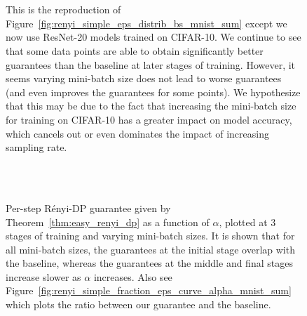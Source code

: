 \begin{figure}[t]
\centering
{}
\\
\\
\caption{This is the reproduction of Figure~\ref{fig:renyi_simple_eps_distrib_bs_mnist_sum} except we now use ResNet-20 models trained on CIFAR-10. We continue to see that some data points are able to obtain significantly better guarantees than the baseline at later stages of training. However, it seems varying mini-batch size does not lead to worse guarantees (and even improves the guarantees for some points). We hypothesize that this may be due to the fact that increasing the mini-batch size for training on CIFAR-10 has a greater impact on model accuracy, which cancels out or even dominates the impact of increasing sampling rate.
}
\label{fig:renyi_simple_eps_distrib_bs_cifar_sum}
\end{figure}

\begin{figure}[t]
\centering
{}
\\
\\
\caption{Per-step R\'enyi-DP guarantee given by Theorem~\ref{thm:easy_renyi_dp} as a function of $\alpha$, plotted at 3 stages of training and varying mini-batch sizes. It is shown that for all mini-batch sizes, the guarantees at the initial stage overlap with the baseline, whereas the guarantees at the middle and final stages increase slower as $\alpha$ increases. Also see Figure~\ref{fig:renyi_simple_fraction_eps_curve_alpha_mnist_sum} which plots the ratio between our guarantee and the baseline.
}
\label{fig:renyi_simple_eps_curve_alpha_mnist_sum}
\end{figure}

